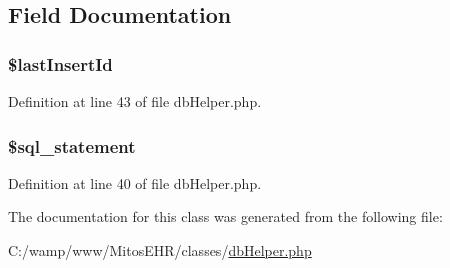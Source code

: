 \subsection{\-Field \-Documentation}
\hypertarget{classdb_helper_ae4ac788f919cb92f528ab1455e8a3e6b}{
\subsubsection[{\$last\-Insert\-Id}]{\setlength{\rightskip}{0pt plus 5cm}\$last\-Insert\-Id}}\label{classdb_helper_ae4ac788f919cb92f528ab1455e8a3e6b}


\-Definition at line 43 of file db\-Helper.\-php.

\hypertarget{classdb_helper_a29c1e591b4e284bca5ae38ed00eea5a9}{
\subsubsection[{\$sql\-\_\-statement}]{\setlength{\rightskip}{0pt plus 5cm}\$sql\-\_\-statement}}\label{classdb_helper_a29c1e591b4e284bca5ae38ed00eea5a9}


\-Definition at line 40 of file db\-Helper.\-php.



\-The documentation for this class was generated from the following file\-:\begin{DoxyCompactItemize}
\item 
\-C\-:/wamp/www/\-Mitos\-E\-H\-R/classes/\hyperlink{db_helper_8php}{db\-Helper.\-php}\end{DoxyCompactItemize}

